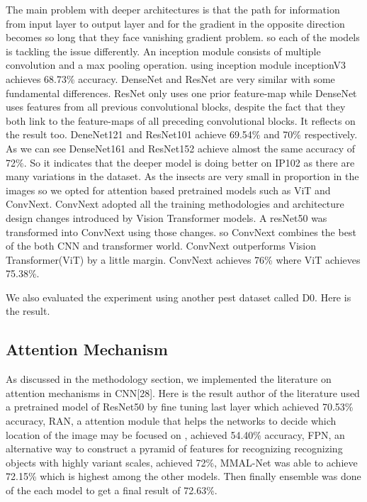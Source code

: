 The main problem with deeper architectures is that the path for information from input layer to output layer and for the gradient in the opposite direction becomes so long that they face vanishing gradient problem. so each of the models is tackling the issue differently. An inception module consists of multiple convolution and a max pooling operation. using inception module inceptionV3 achieves 68.73\% accuracy. DenseNet and ResNet are very similar with some fundamental differences. ResNet only uses one prior feature-map while DenseNet uses features from all previous convolutional blocks, despite the fact that they both link to the feature-maps of all preceding convolutional blocks.   It reflects on the result too. DeneNet121 and ResNet101 achieve 69.54\% and 70\% respectively. As we can see DenseNet161 and ResNet152 achieve almost the same accuracy of 72\%. So it indicates that the deeper model is doing better on IP102 as there are many variations in the dataset. As the insects are very small in proportion in the images so we opted for attention based pretrained models such as ViT and ConvNext. ConvNext adopted all the training methodologies and architecture design changes introduced by Vision Transformer models. A resNet50 was transformed into ConvNext using those changes. so ConvNext combines the best of the both CNN and transformer world. ConvNext outperforms Vision Transformer(ViT) by a little margin. ConvNext achieves 76\% where ViT achieves 75.38\%.

We also evaluated the experiment using another pest dataset called D0. Here is the result.

\subsection{Attention Mechanism}
As discussed in the methodology section, we implemented the literature on attention mechanisms in CNN[28]. Here is the result author of the literature used a pretrained model of ResNet50 by fine tuning last layer which achieved 70.53\% accuracy, RAN, a attention module that helps the networks to decide which location of the image may be focused on , achieved 54.40\% accuracy, FPN, an alternative way to construct a pyramid of features for recognizing recognizing objects with highly variant scales, achieved 72\%, MMAL-Net was able to achieve 72.15\%  which is highest among the other models. Then finally ensemble was done of the each model to get a final result of 72.63\%.\\

